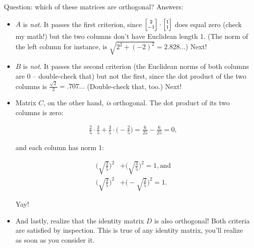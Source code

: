 \smallskip
Question: which of these matrices are orthogonal? Answers:

\vspace{-.1in}
\begin{itemize}
\itemsep.9em

\item $A$ is \textit{not}. It passes the first criterion, since
${\scriptsize \begin{bmatrix} 2 \\ -1 \end{bmatrix}} \cdot
{\scriptsize \begin{bmatrix} 1 \\ 1 \end{bmatrix}}$ does equal zero (check my
math!) but the two columns don't have Euclidean length 1. (The norm of the
left column for instance, is $\sqrt{2^2 + (-2)^2} = 2.828\dots$) Next!

\item $B$ is \textit{not}. It passes the second criterion (the Euclidean norms of both
columns are 0 -- double-check that) but not the first, since the dot product of
the two columns is $\frac{\sqrt{2}}{2} = .707\dots$ (Double-check that, too.)
Next!

\item Matrix $C$, on the other hand, \textit{is} orthogonal. The dot product of
its two columns is zero:

\vspace{-.15in}
\begin{align*}
\frac{2}{5} \cdot \frac{3}{5} + 
\frac{3}{5} \cdot \Big(-\frac{2}{5}\Big) = \frac{6}{25} - \frac{6}{25} = 0,
\end{align*}
\vspace{-.15in}

and each column has norm 1:

\vspace{-.15in}
\begin{align*}
\Bigg(\sqrt{\frac{2}{5}}\Bigg)^2 &+ \Bigg(\sqrt{\frac{3}{5}}\Bigg)^2 = 1,
\textrm{and} \\
\Bigg(\sqrt{\frac{3}{5}}\Bigg)^2 &+ \Bigg(-\sqrt{\frac{2}{5}}\Bigg)^2 = 1.
\end{align*}
\vspace{-.15in}

Yay!

\item And lastly, realize that the identity matrix $D$ is also orthogonal! Both
criteria are satisfied by inspection. This is true of any identity matrix,
you'll realize as soon as you consider it.

\end{itemize}

